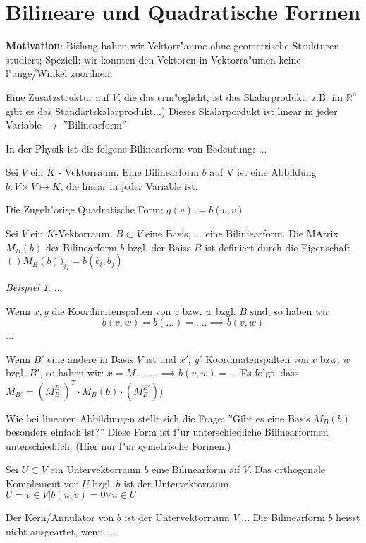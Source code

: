 \documentclass[11pt]{article}
\theoremstyle{remark}
\newtheorem{exa}{Beispiel}[section]
\theoremstyle{definition}
\theoremstyle{remark}
\begin{document}
\section{Bilineare und Quadratische Formen}
\label{sec:bili}
\textbf{Motivation}: Bislang haben wir Vektorr"aume ohne geometrische Strukturen
studiert; Speziell: wir konnten den Vektoren in Vektorra"umen keine
l"ange/Winkel zuordnen.

Eine Zusatzstruktur auf $V$, die das erm"oglicht, ist das Skalarprodukt. z.B.
im $\mathbb{R^n}$ gibt es das Standartskalarprodukt...) Dieses Skalarpordukt ist
linear in jeder Variable $\rightarrow$ ''Bilinearform''

In der Physik ist die folgene Bilinearform von Bedeutung: ...

\begin{definition}
  Sei $V$ ein $K$ - Vektorraum. Eine Bilinearform $b$ auf V ist eine Abbildung
  $b: V\times V \mapsto K$, die linear in jeder Variable ist.

  Die Zugeh"orige Quadratische Form: $q(v):=b(v,v)$
\end{definition}



\begin{definition}
  Sei $V$ ein $K$-Vektorraum, $B\subset V$ eine Basis, ... eine Biliniearform.
  Die MAtrix $M_B(b)$ der Bilinearform $b$ bzgl. der Baiss $B$ ist definiert
  durch die Eigenschaft $()M_B(b))_{ij}=b(b_i, b_j)$
\end{definition}
\begin{exa}
  ...
\end{exa}
Wenn $x,y$ die Koordinatenspalten von $v$ bzw. $w$ bzgl. $B$ sind, so haben wir
\[b(v,w)=b(...)=.... \implies b(v,w)\] ...

Wenn $B'$ eine andere in Basis $V$ ist und $x'$, $y'$ Koordinatenspalten von $v$
bzw. $w$ bzgl. $B'$, so haben wir: $x=M...$ ...  $\implies b(v,w)= ...$ Es
folgt, dass $M_{B'}= (M^{B'}_{B})^T\cdot M_B(b)\cdot (M^{B'}_{B}))$

Wie bei linearen Abbildungen stellt sich die Frage: ''Gibt es eine Basis
$M_B(b)$ besonders einfach ist?'' Diese Form ist f"ur unterschiedliche
Bilinearformen unterschiedlich. (Hier nur f"ur symetrische Formen.)

\begin{definition}
  Sei $U\subset V$ ein Untervektorraum $b$ eine Bilinearform aif $V$. Das
  orthogonale Komplement von $U$ bzgl. $b$ ist der Untervektorraum $U={v\in
    V|b(u,v)=0 \forall u\in U}$

  Der Kern/Annulator von $b$ ist der Untervektorraum $V....$ Die Bilinearform
  $b$ heisst nicht ausgeartet, wenn ...
\end{definition}
\end{document}
